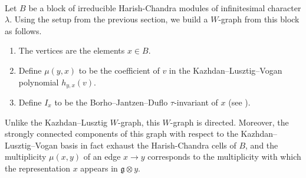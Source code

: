 \noindent\\ Let $B$ be a block of irreducible Harish-Chandra modules of infinitesimal character $\lambda$. Using the setup from the previous section, we build a $W$-graph from this block as follows.
\begin{enumerate}[label=$\bullet$, leftmargin=4\parindent]
\item The vertices are the elements $x \in B$.
\item Define $\mu(y, x)$ to be the coefficient of $v$ in the Kazhdan--Lusztig--Vogan polynomial $h_{y,x}(v)$.
\item Define $I_x$ to be the Borho--Jantzen--Duflo $\tau$-invariant of $x$ (see \cite[Definition 7.3.8]{Vog81}).
\end{enumerate}
\noindent Unlike the Kazhdan--Lusztig $W$-graph, this $W$-graph is directed. Moreover, the strongly connected components of this graph with respect to the Kazhdan--Lusztig--Vogan basis in fact exhaust the Harish-Chandra cells of $B$, and the multiplicity $\mu(x, y)$ of an edge $x \to y$ corresponds to the multiplicity with which the representation $x$ appears in $\mathfrak{g} \otimes y$.\\

